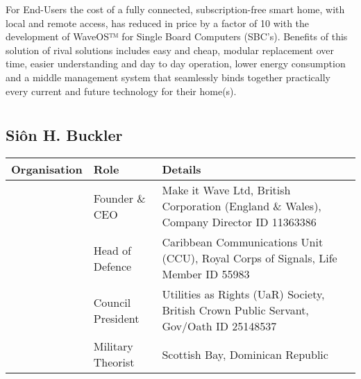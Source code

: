 \documentclass[letterpaper,10pt,english]{sphinxmanual}
\begin{document}
For End-Users the cost of a fully connected, subscription-free smart home, with local and remote access, has reduced in price by a factor of 10 with the development of WaveOS™ for Single Board Computers (SBC’s). Benefits of this solution of rival solutions includes easy and cheap, modular replacement over time, easier understanding and day to day operation, lower energy consumption and a middle management system that seamlessly binds together practically every current and future technology for their home(s).


\section{}
\label{\detokenize{index:document-author-s}}

\subsection{Siôn H. Buckler}
\label{\detokenize{index:sion-h-buckler}}

\begin{savenotes}\sphinxattablestart
\centering
\begin{tabulary}{\linewidth}[t]{|T|T|T|}
\hline
\sphinxstyletheadfamily 
Organisation
&\sphinxstyletheadfamily 
Role
&\sphinxstyletheadfamily 
Details
\\
\hline
\noindent{}
&
Founder \& CEO
&
Make it Wave Ltd, British Corporation (England \& Wales), Company Director ID 11363386
\\
\hline
\noindent{}
&
Head of Defence
&
Caribbean Communications Unit (CCU), Royal Corps of Signals, Life Member ID 55983
\\
\hline
\noindent{}
&
Council President
&
Utilities as Rights (UaR) Society, British Crown Public Servant, Gov/Oath ID 25148537
\\
\hline
\noindent{}
&
Military Theorist
&
Scottish Bay, Dominican Republic
\\
\hline
\end{tabulary}
\par
\sphinxattableend\end{savenotes}
\end{document}
